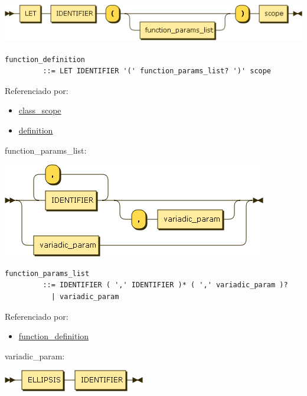 \includegraphics[width=5.97917in,height=0.70833in]{diagram/function_definition.png}

\begin{verbatim}
function_definition
         ::= LET IDENTIFIER '(' function_params_list? ')' scope
\end{verbatim}

Referenciado por:

\begin{itemize}
\tightlist
\item
  \protect\hyperlink{class_scope}{class\_scope}
\item
  \protect\hyperlink{definition}{definition}
\end{itemize}

\protect\hypertarget{function_params_list}{}{function\_params\_list:}

\includegraphics[width=4.56250in,height=1.62500in]{diagram/function_params_list.png}

\begin{verbatim}
function_params_list
         ::= IDENTIFIER ( ',' IDENTIFIER )* ( ',' variadic_param )?
           | variadic_param
\end{verbatim}

Referenciado por:

\begin{itemize}
\tightlist
\item
  \protect\hyperlink{function_definition}{function\_definition}
\end{itemize}

\protect\hypertarget{variadic_param}{}{variadic\_param:}

\includegraphics[width=2.43750in,height=0.37500in]{diagram/variadic_param.png}

